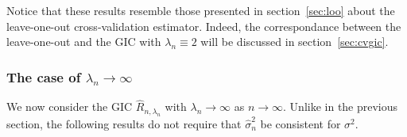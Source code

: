 \documentclass[11pt, letter paper]{article}
\newcommand{\1}{\mathmybb{1}}
\newtheorem{proposition}{Proposition}[section]
\newcommand{\0}{\emptyset}
\newcommand{\prob}{\mathbb{P}}
\newcommand{\paren}[1]{\left(#1 \right)}
\newcommand{\norm}[1]{|\hspace{-1pt}|#1 |\hspace{-1pt}|}
\newcommand{\normsq}[1]{\norm{#1}^{2}}
\newcommand{\Acal}{\mathcal{A}_{n}}
\newcommand{\Tcal}{\mathcal{T}_{n}}
\newcommand{\Ncal}{\mathcal{N}}
\newcommand{\e}{\boldsymbol{e}}
\newcommand{\Loss}[1]{L_{n}\paren{#1}}
\newcommand{\Rhat}[2]{\hat{R}_{n, #1}\paren{#2}}
\newcommand{\op}[1]{o_{\prob}\paren{#1}}
\newcommand{\sigmahat}{\hat{\sigma}^{2}_{n}}
\begin{document}

Notice that these results resemble those presented in section~{\ref{sec:loo}} about the leave-one-out cross-validation estimator. Indeed, the correspondance between the leave-one-out and the GIC with \(\lambda_{n}\equiv 2\) will be discussed in section~{\ref{sec:cvgic}}.


\subsubsection{The case of \(\lambda_{n} \to \infty\)}

We now consider the GIC \(\hat{R}_{n,\lambda_{n}}\) with \(\lambda_{n}\to\infty\) as \(n\to \infty\). Unlike in the previous section, the following results do not require that \(\sigmahat\) be consistent for \(\sigma^{2}\).
\end{document}
